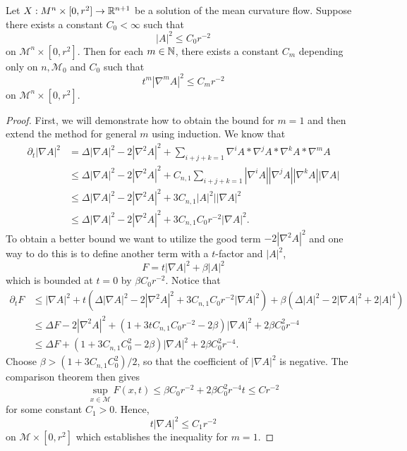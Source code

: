 \begin{lemma}
    Let $ X : M^{n} \times [0,r^{2}] \to \mathbb{R}^{n+1}  $ be a solution of the mean curvature flow. Suppose there exists a constant $ C_{0} < \infty$ such that 
    \[ |A|^{2} \le C_{0}r^{-2} \]
    on $ \mathcal{M}^{n} \times [0,r^{2}] $. Then for each $ m \in \mathbb{N} $, there exists a constant $ C_{m} $ depending only on $ n, \mathcal{M}_{0} $ and $C_{0} $ such that 
    \[ t^{m}|\nabla^{m}A|^{2} \le C_{m}r^{-2} \]
    on $ \mathcal{M}^{n} \times [0,r^{2}] $. 
\end{lemma}
\begin{proof}
    First, we will demonstrate how to obtain the bound for $ m=1 $ and then extend the method for general $ m $ using induction. We know that 
    \begin{align*}
        \partial_{t}|\nabla A|^{2} & = \Delta|\nabla A|^{2}-2|\nabla^{2} A|^{2} + \sum_{i+j+k=1}^{}\nabla^{i}A* \nabla^{j}A *\nabla^{k}A * \nabla^{m}A \\
        & \le \Delta|\nabla A|^{2}-2|\nabla^{2} A|^{2} + C_{n,1} \sum_{i+j+k=1}^{}|\nabla^{i}A||\nabla^{j}A| |\nabla^{k}A||\nabla A|  \\
        & \le \Delta|\nabla A|^{2} -2 |\nabla^{2} A|^{2}+3C_{n,1}|A|^{2}||\nabla A|^{2} \\
        & \le \Delta|\nabla A|^{2} -2 |\nabla^{2} A|^{2}+3C_{n,1}C_{0}r^{-2}|\nabla A|^{2}.
    \end{align*}
    To obtain a better bound we want to utilize the good term $ -2|\nabla^{2}A|^{2} $ and one way to do this is to define another term with a $ t $-factor and $ |A|^{2} $,
    \[ F = t|\nabla A|^{2} + \beta|A|^{2}\]
    which is bounded at $ t=0 $ by $ \beta C_{0}r^{-2} $. Notice that \begin{align*}
        \partial_{t}F & \le |\nabla A|^{2}+ t\left(\Delta|\nabla A|^{2}-2|\nabla^{2} A|^{2} +3C_{n,1}C_{0}r^{-2}|\nabla A|^{2} \right) + \beta\left( \Delta |A|^{2}- 2|\nabla A|^{2} + 2|A|^{4} \right) \\
        & \le \Delta F -2|\nabla^{2}A|^{2}+  \left(1 +3tC_{n,1}C_{0}r^{-2}-2\beta  \right) |\nabla A|^{2} + 2\beta C_{0}^{2}r^{-4} \\
        & \le \Delta F + \left( 1+ 3C_{n,1}C_{0}^{2}-2 \beta \right)| \nabla A|^{2} + 2 \beta C_{0}^{2}r^{-4}.
    \end{align*}
    Choose  $ \beta > (1+3C_{n,1}C_{0}^{2}) /2 $, so that the coefficient of $ |\nabla A|^{2} $ is negative. The comparison theorem then gives 
    \[ \sup_{ x \in \mathcal{M} }F(x,t) \le \beta C_{0}r^{-2}+ 2 \beta C_{0}^{2}r^{-4}t \le Cr^{-2} \]
    for some constant $ C_{1} >0 $. Hence, 
    \[ t|\nabla A|^{2} \le C_{1}r^{-2} \]
    on $ \mathcal{M} \times [0,r^{2}] $ which establishes the inequality for $ m=1 $. 


\end{proof}
